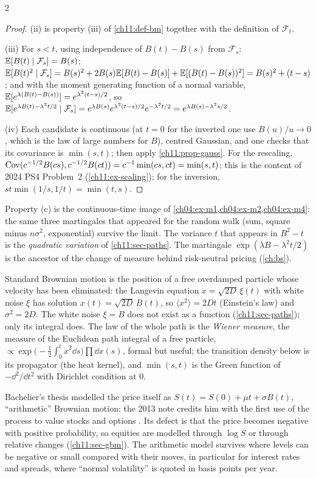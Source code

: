\begin{paracol}{2}
\begin{proof}
(ii) is property (iii) of \cref{ch11:def-bm} together with the definition of $\mathcal F_t$.

(iii) For $s<t$, using independence of
$B(t)-B(s)$ from $\mathcal F_s$: $\mathbb{E}[B(t)\mid\mathcal F_s]=B(s)$;
$\mathbb{E}[B(t)^2\mid\mathcal F_s]=B(s)^2+2B(s)\mathbb{E}[B(t)-B(s)]+\mathbb{E}[(B(t)-B(s))^2]=B(s)^2+(t-s)$; and with the moment generating
function of a normal variable, $\mathbb{E}[e^{\lambda(B(t)-B(s))}]=e^{\lambda^2(t-s)/2}$, so
$\mathbb{E}[e^{\lambda B(t)-\lambda^2t/2}\mid\mathcal F_s]=e^{\lambda B(s)}e^{\lambda^2(t-s)/2}e^{-\lambda^2t/2}=e^{\lambda B(s)-\lambda^2s/2}$.

(iv) Each candidate is continuous (at $t=0$ for the inverted one use $B(u)/u\to0$, which is the law of large numbers for
$B$), centred Gaussian, and one checks that its covariance is $\min(s,t)$; then apply \cref{ch11:prop-gauss}.
For the rescaling, $\operatorname{Cov}(c^{-1/2}B(cs),c^{-1/2}B(ct))=c^{-1}\min(cs,ct)=\min(s,t)$; this is the content of 2024 PS4
Problem~2 (\cref{ch11:ex-scaling}); for the inversion, $st\min(1/s,1/t)=\min(t,s)$.
\end{proof}

Property (c) is the continuous-time image of \cref{ch04:ex-m1,ch04:ex-m2,ch04:ex-m4}: the same three martingales that
appeared for the random walk (sum, square minus $n\sigma^2$, exponential) survive the limit. The variance $t$ that
appears in $B^2-t$ is the \emph{quadratic variation} of \cref{ch11:sec-paths}. The martingale $\exp(\lambda B-\lambda^2t/2)$ is
the ancestor of the change of measure behind risk-neutral pricing (\cref{ch:bs}).

\begin{intuition}\label{ch11:int-physics}
Standard Brownian motion is the position of a free overdamped particle whose velocity has been eliminated: the Langevin
equation $\dot x=\sqrt{2D}\,\xi(t)$ with white noise $\xi$ has solution $x(t)=\sqrt{2D}\,B(t)$, so
$\langle x^2\rangle=2Dt$ (Einstein's law) and $\sigma^2=2D$. The white noise $\xi=\dot B$ does not exist as a function
(\cref{ch11:sec-paths}); only its integral does. The law of the whole path is the \emph{Wiener measure}, the measure of the
Euclidean path integral of a free particle,
$\propto\exp\bigl(-\tfrac12\int_0^t\dot x^2\dd s\bigr)\prod\dd x(s)$, formal but useful; the transition density below is
its propagator (the heat kernel), and $\min(s,t)$ is the Green function of $-\dd^2/\dd t^2$ with Dirichlet condition at $0$.
\end{intuition}

\begin{finance}
Bachelier's thesis modelled the price itself as $S(t)=S(0)+\mu t+\sigma B(t)$, ``arithmetic'' Brownian motion; the
2013 note credits him with the first use of the process to value stocks and options . Its defect is that the price becomes
negative with positive probability, so equities are modelled through $\log S$ or through relative changes
(\cref{ch11:sec-gbm}). The arithmetic model survives where levels can be negative or small compared with their moves, in
particular for interest rates and spreads, where ``normal volatility'' is quoted in basis points per year.
\end{finance}


\end{paracol}
